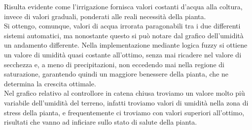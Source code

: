 \documentclass[conference,10pt]{IEEEtran}
\begin{document}
Risulta evidente come l'irrigazione fornisca valori costanti d'acqua alla coltura, invece di valori graduali, ponderati alle reali necessità della pianta.\\
Si ottengo, comunque, valori di acqua irrorata paragonabili tra i due differenti sistemi automatici, ma nonostante questo si può notare dal grafico dell'umidità un andamento differente. Nella implementazione mediante logica fuzzy si ottiene un valore di umidità quasi costante all'ottimo, senza mai ricadere nel valore di secchezza e, a meno di precipitazioni, non eccedendo mai nella regione di saturazione, garantendo quindi un maggiore benessere della pianta, che ne determina la crescita ottimale.\\
Nel grafico relativo al controllore in catena chiusa troviamo un valore molto più variabile dell'umidità del terreno, infatti troviamo valori di umidità nella zona di stress della pianta, e frequentemente ci troviamo con valori superiori all'ottimo, risultati che vanno ad inficiare sullo stato di salute della pianta.





\end{document}
